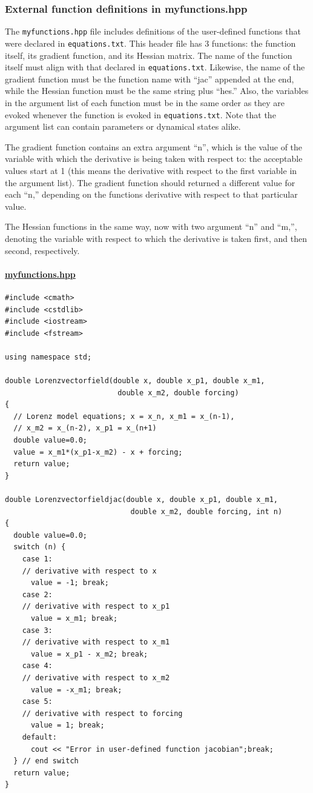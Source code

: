 \documentclass[11pt]{article}
\begin{document}
{\subsubsection{External function definitions in myfunctions.hpp}

The \texttt{myfunctions.hpp} file includes definitions of the user-defined functions that were declared in \texttt{equations.txt}. This header file has 3 functions: the function itself, its gradient function, and its Hessian matrix. The name of the function itself must align with that declared in \texttt{equations.txt}. Likewise, the name of the gradient function must be the function name with ``jac'' appended at the end, while the Hessian function must be the same string plus ``hes.'' Also, the variables in the argument list of each function must be in the same order as they are evoked whenever the function is evoked in \texttt{equations.txt}. Note that the argument list can contain parameters or dynamical states alike. 

The gradient function contains an extra argument ``n'', which is the value of the variable with which the derivative is being taken with respect to: the acceptable values start at 1 (this means the derivative with respect to the first variable in the argument list). The gradient function should returned a different value for each ``n,'' depending on the functions derivative with respect to that particular value.

The Hessian functions in the same way, now with two argument ``n'' and ``m,'', denoting the variable with respect to which the derivative is taken first, and then second, respectively. 


\paragraph{\underline{myfunctions.hpp}}


\begin{verbatim}
#include <cmath>
#include <cstdlib>
#include <iostream>
#include <fstream>

using namespace std;

double Lorenzvectorfield(double x, double x_p1, double x_m1, 
                          double x_m2, double forcing)
{
  // Lorenz model equations; x = x_n, x_m1 = x_(n-1), 
  // x_m2 = x_(n-2), x_p1 = x_(n+1)
  double value=0.0;
  value = x_m1*(x_p1-x_m2) - x + forcing;
  return value;
}

double Lorenzvectorfieldjac(double x, double x_p1, double x_m1, 
                             double x_m2, double forcing, int n)
{
  double value=0.0;
  switch (n) {
    case 1:
    // derivative with respect to x
      value = -1; break;
    case 2:
    // derivative with respect to x_p1
      value = x_m1; break;
    case 3:
    // derivative with respect to x_m1
      value = x_p1 - x_m2; break;
    case 4:
    // derivative with respect to x_m2
      value = -x_m1; break;
    case 5:
    // derivative with respect to forcing
      value = 1; break;
    default:
      cout << "Error in user-defined function jacobian";break;
  } // end switch
  return value;
}


\end{verbatim}}
\end{document}
